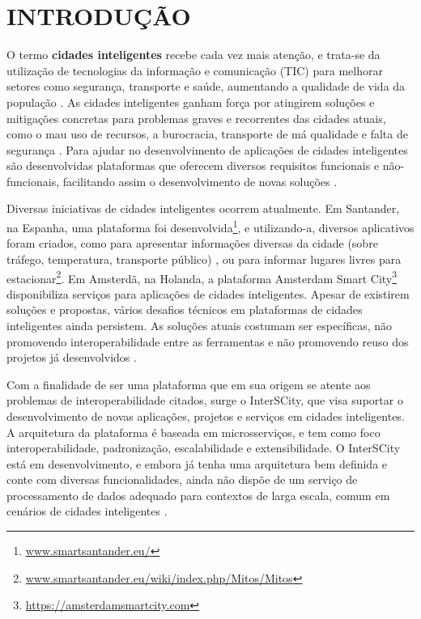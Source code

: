 \chapter[INTRODUÇÃO]{INTRODUÇÃO}
\label{chapter:intro}

O termo \textbf{cidades inteligentes} recebe cada vez mais atenção, e trata-se
da utilização de tecnologias da informação e comunicação (TIC) para melhorar
setores como segurança, transporte e saúde, aumentando a qualidade de vida
da população \cite{batty2012smart}. As cidades inteligentes ganham força por
atingirem soluções e mitigações concretas para problemas graves e recorrentes
das cidades atuais, como o mau uso de recursos, a burocracia, transporte de má
qualidade e falta de segurança \cite{batty2012smart}. Para ajudar no
desenvolvimento de aplicações de cidades inteligentes são desenvolvidas
plataformas que oferecem diversos requisitos funcionais e não-funcionais,
facilitando assim o desenvolvimento de novas soluções \cite{kon2016}.

Diversas iniciativas de cidades inteligentes ocorrem atualmente. Em Santander,
na Espanha, uma plataforma foi
desenvolvida\footnote{\url{www.smartsantander.eu/}}, e utilizando-a,
diversos aplicativos foram criados, como para apresentar informações diversas
da cidade (sobre tráfego, temperatura, transporte público)
\cite{gutierrez2013}, ou para informar lugares livres para
estacionar\footnote{\url{www.smartsantander.eu/wiki/index.php/Mitos/Mitos}}.
Em Amsterdã, na Holanda, a plataforma Amsterdam Smart
City\footnote{\url{https://amsterdamsmartcity.com}} disponibiliza serviços para
aplicações de cidades inteligentes. Apesar de existirem soluções
e propostas, vários desafios técnicos em plataformas de cidades inteligentes
ainda persistem. As soluções atuais costumam ser específicas, não promovendo
interoperabilidade entre as ferramentas e não promovendo reuso dos projetos já
desenvolvidos \cite{delesposte2017}.

Com a finalidade de ser uma plataforma que em sua origem se atente aos
problemas de interoperabilidade citados, surge o InterSCity, que visa
suportar o desenvolvimento de novas aplicações, projetos e serviços em cidades
inteligentes. A arquitetura da plataforma é baseada em microsserviços, e
tem como foco interoperabilidade, padronização, escalabilidade e
extensibilidade. O InterSCity está em desenvolvimento, e embora já tenha uma
arquitetura bem definida e conte com diversas funcionalidades, ainda não dispõe
de um serviço de processamento de dados adequado para contextos de larga
escala, comum em cenários de cidades inteligentes \cite{alnuaimi2015}.

